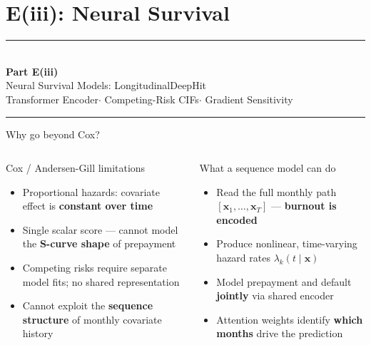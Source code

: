 \documentclass[10pt,aspectratio=169]{beamer}
\begin{document}
\section{E(iii): Neural Survival}

\begin{frame}
    \vfill
    \begin{center}
        {\color{accent}\rule{0.28\linewidth}{1.2pt}}\\[0.7em]
        {\Large\bfseries Part E(iii)}\\[0.5em]
        {\large Neural Survival Models: LongitudinalDeepHit}\\[0.4em]
        {\small Transformer Encoder\enspace$\cdot$\enspace
                Competing-Risk CIFs\enspace$\cdot$\enspace
                Gradient Sensitivity}\\[0.7em]
        {\color{accent}\rule{0.28\linewidth}{1.2pt}}
    \end{center}
    \vfill
\end{frame}

\begin{frame}{Why go beyond Cox?}
    \begin{columns}[T,onlytextwidth]
        \begin{block}{Cox / Andersen-Gill limitations}
        \small
        \begin{itemize}\itemsep4pt
            \item Proportional hazards: covariate effect is \textbf{constant over time}
            \item Single scalar score --- cannot model the \textbf{S-curve shape} of prepayment
            \item Competing risks require separate model fits; no shared representation
            \item Cannot exploit the \textbf{sequence structure} of monthly covariate history
        \end{itemize}
        \end{block}

        \begin{block}{What a sequence model can do}
        \small
        \begin{itemize}\itemsep4pt
            \item Read the full monthly path $[\mathbf{x}_1, \dots, \mathbf{x}_T]$ --- \textbf{burnout is encoded}
            \item Produce nonlinear, time-varying hazard rates $\lambda_k(t \mid \mathbf{x})$
            \item Model prepayment and default \textbf{jointly} via shared encoder
            \item Attention weights identify \textbf{which months} drive the prediction
        \end{itemize}
        \end{block}
    \end{columns}
\end{frame}
\end{document}
